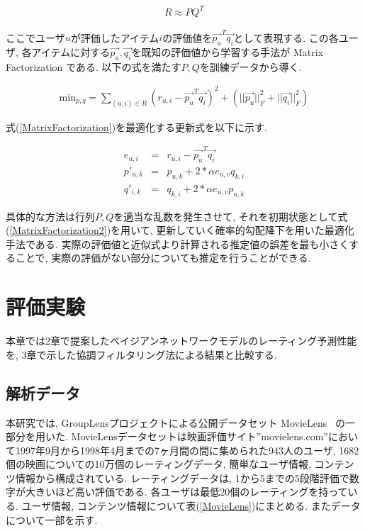 \documentclass[a4paper]{jarticle}
\begin{document}
\begin{eqnarray}
R \approx P  Q^T
\end{eqnarray}

ここでユーザ$u$が評価したアイテム$i$の評価値を$\vec{p_u}^T \vec{q_i}$として表現する. この各ユーザ, 各アイテムに対する$\vec{p_u}, \vec{q_i}$を既知の評価値から学習する手法が Matrix Factorization である. 以下の式を満たす$P, Q$を訓練データから導く.

\begin{eqnarray}
\label{MatrixFactorization}
\mbox{min}_{p,q} = \sum_{(u, i) \in R} (r_{u, i} - \vec{p_u}^T \vec{q_i})^2 + (||\vec{p_u}||^2_F + ||\vec{q_i}||^2_F)
\end{eqnarray}

式(\ref{MatrixFactorization})を最適化する更新式を以下に示す.

\begin{eqnarray}
\label{MatrixFactorization2}
e_{u, i} &=& r_{u, i} - \vec{p_u}^T \vec{q_i} \\
p'_{u, k} &=& p_{u, k} + 2 * \alpha e_{u, v} q_{k, i} \\
q'_{i, k} &=& q_{k, i} + 2 * \alpha e_{u, v} p_{u, k}
\end{eqnarray}

具体的な方法は行列$P,Q$を適当な乱数を発生させて, それを初期状態として式(\ref{MatrixFactorization2})を用いて, 更新していく確率的勾配降下を用いた最適化手法である. 実際の評価値と近似式より計算される推定値の誤差を最も小さくすることで, 実際の評価がない部分についても推定を行うことができる.

\section{評価実験}

本章では2章で提案したベイジアンネットワークモデルのレーティング予測性能を, 3章で示した協調フィルタリング法による結果と比較する.

\subsection{解析データ}

本研究では, GroupLensプロジェクトによる公開データセット MovieLens~\cite{MovieLens} の一部分を用いた. MovieLensデータセットは映画評価サイト''movielens.com''において1997年9月から1998年4月までの7ヶ月間の間に集められた943人のユーザ, 1682個の映画についての10万個のレーティングデータ, 簡単なユーザ情報, コンテンツ情報から構成されている. レーティングデータは, 1から5までの5段階評価で数字が大きいほど高い評価である. 各ユーザは最低20個のレーティングを持っている. ユーザ情報, コンテンツ情報について表(\ref{MovieLens})にまとめる. またデータについて一部を示す.
\end{document}
